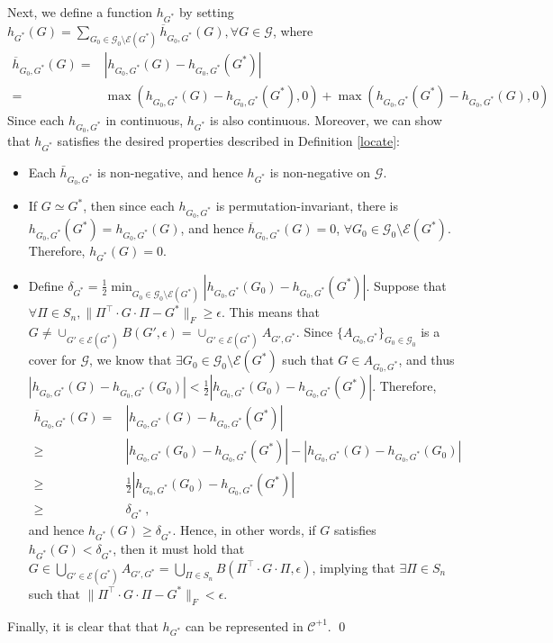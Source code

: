 \documentclass{article}
\def\Gfun{\mathcal{G}}
\begin{document}
Next, we define a function $h_{G^*}$ by setting $h_{G^*}(G) = \sum_{G_0 \in \Gfun_0 \setminus \mathcal{E}(G^*)} \overline{h}_{G_0, G^*}(G), \forall G \in \Gfun$, where 
\begin{equation*}
\begin{split}
    \overline{h}_{G_0, G^*}(G) =& |h_{G_0, G^*}(G) - h_{G_0, G^*}(G^*)| \\
    =& \max(h_{G_0, G^*}(G) - h_{G_0, G^*}(G^*), 0) + \max(h_{G_0, G^*}(G^*) - h_{G_0, G^*}(G), 0)
\end{split}
\end{equation*}
Since each $h_{G_0, G^*}$ in continuous, $h_{G^*}$ is also continuous. Moreover, we can show that $h_{G^*}$ satisfies the desired properties described in Definition \ref{locate}:
\begin{itemize}
    \item Each $\bar{h}_{G_0, G^*}$ is non-negative, and hence $h_{G^*}$ is non-negative on $\Gfun$.
    \item If $G \simeq G^*$, then since each $h_{G_0, G^*}$ is permutation-invariant, there is $h_{G_0, G^*}(G^*) = h_{G_0, G^*}(G)$, and hence $\overline{h}_{G_0, G^*}(G) = 0$, $\forall G_0 \in \Gfun_0 \setminus \mathcal{E}(G^*)$. Therefore, $h_{G^*}(G) = 0$.
    \item Define $\delta_{G^*} = \frac{1}{2} \min_{G_0 \in \Gfun_0 \setminus \mathcal{E}(G^*)} |h_{G_0, G^*}(G_0) - h_{G_0, G^*}(G^*)|$.
    Suppose that $\forall \Pi \in S_n, \| \Pi^\intercal \cdot G \cdot \Pi - G^*\|_F \geq \epsilon$. This means that $G \neq \cup_{G' \in \mathcal{E}(G^*)} B(G', \epsilon) = \cup_{G' \in \mathcal{E}(G^*)} A_{G', G^*}$. Since $\{ A_{G_0, G^*}\}_{G_0 \in \Gfun_0}$ is a cover for $\Gfun$, we know that 
    $\exists G_0 \in \Gfun_0 \setminus \mathcal{E}(G^*)$ such that $G \in A_{G_0, G^*}$, and thus $|h_{G_0, G^*}(G) - h_{G_0, G^*}(G_0)| < \frac{1}{2} |h_{G_0, G^*}(G_0) - h_{G_0, G^*}(G^*)|$. Therefore, 
    \begin{equation*}
    \begin{split}
        \overline{h}_{G_0, G^*}(G) =& |h_{G_0, G^*}(G) - h_{G_0, G^*}(G^*)| \\
        \geq & |h_{G_0, G^*}(G_0) - h_{G_0, G^*}(G^*)| - |h_{G_0, G^*}(G) - h_{G_0, G^*}(G_0)| \\
        \geq & \frac{1}{2} |h_{G_0, G^*}(G_0) - h_{G_0, G^*}(G^*)| \\
        \geq & \delta_{G^*}~,
    \end{split}
    \end{equation*}
    and hence $h_{G^*}(G) \geq \delta_{G^*}$.
    Hence, in other words, if $G$ satisfies $h_{G^*}(G) < \delta_{G^*}$, then it must hold that $G \in \bigcup_{G' \in \mathcal{E}(G^*)} A_{G', G^*} = \bigcup_{\Pi \in S_n} B(\Pi^\intercal \cdot G \cdot \Pi, \epsilon)$, implying that $\exists \Pi \in S_n$ such that $\| \Pi^\intercal \cdot G \cdot \Pi - G^*\|_F < \epsilon$.
\end{itemize}
Finally, it is clear that that $h_{G^*}$ can be represented in $\mathcal{C}^{+1}$. \qed
\end{document}
